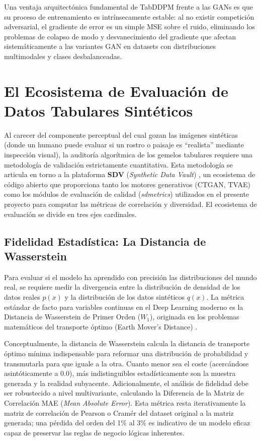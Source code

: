 Una ventaja arquitectónica fundamental de TabDDPM frente a las GANs es que su proceso de entrenamiento es intrínsecamente estable: al no existir competición adversarial, el gradiente de error es un simple MSE sobre el ruido, eliminando los problemas de colapso de modo y desvanecimiento del gradiente que afectan sistemáticamente a las variantes GAN en datasets con distribuciones multimodales y clases desbalanceadas.

\section{El Ecosistema de Evaluación de Datos Tabulares Sintéticos}

Al carecer del componente perceptual del cual gozan las imágenes sintéticas (donde un humano puede evaluar si un rostro o paisaje es ``realista'' mediante inspección visual), la auditoría algorítmica de los gemelos tabulares requiere una metodología de validación estrictamente cuantitativa. Esta metodología se articula en torno a la plataforma \textbf{SDV} (\textit{Synthetic Data Vault}) \parencite{sdv2023}, un ecosistema de código abierto que proporciona tanto los motores generativos (CTGAN, TVAE) como los módulos de evaluación de calidad (\textit{sdmetrics}) utilizados en el presente proyecto para computar las métricas de correlación y diversidad. El ecosistema de evaluación se divide en tres ejes cardinales.

\subsection{Fidelidad Estadística: La Distancia de Wasserstein}

Para evaluar si el modelo ha aprendido con precisión las distribuciones del mundo real, se requiere medir la divergencia entre la distribución de densidad de los datos reales $p(x)$ y la distribución de los datos sintéticos $q(x)$. La métrica estándar de facto para variables continuas en el Deep Learning moderno es la Distancia de Wasserstein de Primer Orden ($W_1$), originada en los problemas matemáticos del transporte óptimo (Earth Mover's Distance) \parencite{villani2008wasserstein}.

Conceptualmente, la distancia de Wasserstein calcula la distancia de transporte óptimo mínima indispensable para reformar una distribución de probabilidad y transmutarla para que iguale a la otra. Cuanto menor sea el coste (acercándose asintóticamente a 0.0), más indistinguibles estadísticamente son la muestra generada y la realidad subyacente. Adicionalmente, el análisis de fidelidad debe ser robustecido a nivel multivariante, calculando la Diferencia de la Matriz de Correlación MAE (\textit{Mean Absolute Error}). Esta métrica resta iterativamente la matriz de correlación de Pearson o Cramér del dataset original a la matriz generada; una pérdida del orden del 1\% al 3\% es indicativo de un modelo eficaz capaz de preservar las reglas de negocio lógicas inherentes.

